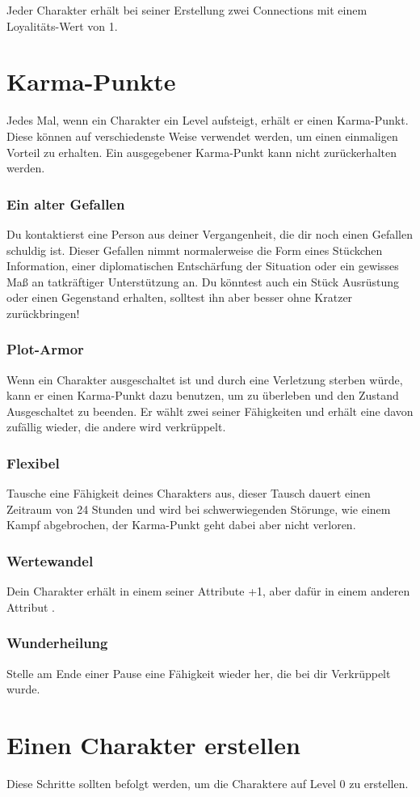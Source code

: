 Jeder Charakter erhält bei seiner Erstellung zwei Connections mit einem Loyalitäts-Wert von 1.
\section{Karma-Punkte}
Jedes Mal, wenn ein Charakter ein Level aufsteigt, erhält er einen Karma-Punkt. Diese können auf verschiedenste Weise verwendet werden, um einen einmaligen Vorteil zu erhalten. Ein ausgegebener Karma-Punkt kann nicht zurückerhalten werden.
\subsubsection{Ein alter Gefallen}
Du kontaktierst eine Person aus deiner Vergangenheit, die dir noch einen Gefallen schuldig ist. Dieser Gefallen nimmt normalerweise die Form eines Stückchen Information, einer diplomatischen Entschärfung der Situation oder ein gewisses Maß an tatkräftiger Unterstützung an. Du könntest auch ein Stück Ausrüstung oder einen Gegenstand erhalten, solltest ihn aber besser ohne Kratzer zurückbringen!
\subsubsection{Plot-Armor} 
Wenn ein Charakter ausgeschaltet ist und durch eine Verletzung sterben würde, kann er einen Karma-Punkt dazu benutzen, um zu überleben und den Zustand \glqq Ausgeschaltet\grqq{} zu beenden. Er wählt zwei seiner Fähigkeiten und erhält eine davon zufällig wieder, die andere wird verkrüppelt.
\subsubsection{Flexibel} 
Tausche eine Fähigkeit deines Charakters aus, dieser Tausch dauert einen Zeitraum von 24 Stunden und wird bei schwerwiegenden Störunge, wie einem Kampf abgebrochen, der Karma-Punkt geht dabei aber nicht verloren.
\subsubsection{Wertewandel} 
Dein Charakter erhält in einem seiner Attribute \glqq +1\grqq{}, aber dafür in einem anderen Attribut \grqq{}.
\subsubsection{Wunderheilung}
Stelle am Ende einer Pause eine Fähigkeit wieder her, die bei dir Verkrüppelt wurde.
\section{Einen Charakter erstellen}
Diese Schritte sollten befolgt werden, um die Charaktere auf Level 0 zu erstellen.
